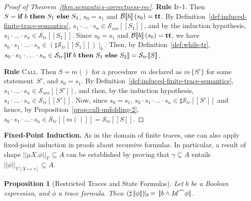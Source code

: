 \documentclass[10pt,a4paper]{amsart}
\newtheorem{proposition}[theorem]{Proposition}
\theoremstyle{definition}
\newcommand{\SOSTrans}[2]{#1 \Rightarrow #2}
\newcommand{\config}[2]{\left< #1, #2 \right>}
\newcommand{\SOSConfFinTrans}[3]{\SOSTrans{\config{#1}{#2}}{#3}}
\newcommand{\denot}[1]{\left[\!\left[#1\right]\!\right]}
\newcommand{\fdenot}[1]{\left|\!\left|#1\right|\!\right|}
\newcommand{\bexdenot}[1]{\mathcal{B}\!\denot{#1}}
\newcommand{\trcdenot}[1]{\mathcal{S}_{\mathit{tr}}\!\denot{#1}}
\newcommand{\sosdenot}[1]{\mathcal{S}_{\mathit{sos}}\!\denot{#1}}
\newcommand{\logdenot}[1]{\left|\!\left|#1\right|\!\right|_{\mathcal{V}}}
\newcommand{\logdenotsubst}[3]{\left|\!\left|#1\right|\!\right|_{\mathcal{V} [#2 \mapsto #3]}}
\newcommand{\chop}[0]{\raisebox{1ex}{$\frown$}}
\newcommand{\If}{\mbox{\bf if}}
\newcommand{\Then}{\mbox{\bf then}}
\newcommand{\Else}{\mbox{\bf else}}
\newcommand{\ttt}{\mbox{\bf tt}}
\begin{document}
\begin{proof}[Proof of Theorem~\ref{thm:semantics-correctness-rec}]

\noindent\textbf{Rule} \textsc{If-1}. 
%
Then $S = \If\ b\ \Then\ S_1\ \Else\ S_2$, $s_0 = s_1$ and
$\bexdenot{b} (s_0) = \ttt$.
%
By Definition~\ref{def:induced-finite-trace-semantics},
$s_1 \cdot \ldots \cdot s_n \in \sosdenot{S_1}$,
and by the induction hypothesis, 
$s_1 \cdot \ldots \cdot s_n \in \trcdenot{S_1}$.
%
Since $s_0 = s_1$ and $\bexdenot{b} (s_0) = \ttt$, we have
$s_0 \cdot s_1 \cdot \ldots \cdot s_n \in 
 (\sharp \trcdenot{S_1}) \!\!\mid_b$.
Then, by Definition~\ref{def:while-tr},
$s_0 \cdot s_1 \cdot \ldots \cdot s_n \in 
 \trcdenot{\If\ b\ \Then\ S_1\ \Else\ S_2}=\trcdenot{S}$.

\noindent\textbf{Rule} \textsc{Call}. 
%
Then $S = m ()$ for a procedure~$m$ declared as $m\, \{S'\}$ for some
statement~$S'$, and $s_0 = s_1$.
%
By Definition~\ref{def:induced-finite-trace-semantics}, 
$s_1 \cdot \ldots \cdot s_n \in \sosdenot{S'}$, and then, by the
induction hypothesis, $s_1 \cdot \ldots \cdot s_n \in \trcdenot{S'}$.
%
Now, since $s_0 = s_1$, 
$s_0 \cdot s_1 \cdot \ldots \cdot s_n \in \sharp \trcdenot{S'}$ 
and hence, by Proposition~\ref{prop:call-unfolding-2},
$s_0 \cdot s_1 \cdot \ldots \cdot s_n \in \trcdenot{m ()}=\trcdenot{S}$. 

\end{proof}

\noindent\textbf{Fixed-Point Induction.}
%
As in the domain of finite traces,
one can also apply
fixed-point induction in proofs about recursive formulas.
%
In particular, a result of shape $\logdenot{\mu X. \phi} \subseteq A$
can be established by proving that $\gamma \subseteq A$ entails
$\logdenotsubst{\phi}{X}{\gamma} \subseteq A$.

\begin{proposition}[Restricted Traces and State Formulas]
  \label{prop:state-restr}
  Let $b$ be a Boolean expression, and $\phi$ a trace formula. Then
  $
    (\sharp\fdenot{\phi})\!\!\mid_b\,=\,\fdenot{b\land\mathit{Id}\chop\phi}
  $.
\end{proposition}
\end{document}
